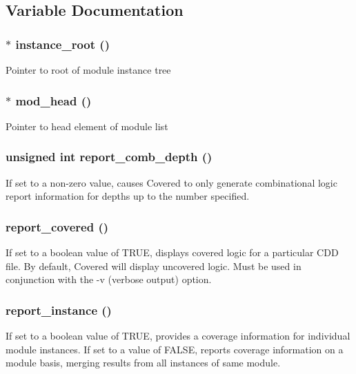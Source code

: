 \subsection{Variable Documentation}
\subsubsection{$\ast$ instance\_\-root ()}\label{comb_8c_a0}


Pointer to root of module instance tree 
\subsubsection{$\ast$ mod\_\-head ()}\label{comb_8c_a1}


Pointer to head element of module list 
\subsubsection{\setlength{\rightskip}{0pt plus 5cm}unsigned int report\_\-comb\_\-depth ()}\label{comb_8c_a3}


If set to a non-zero value, causes Covered to only generate combinational logic report information for depths up to the number specified. 
\subsubsection{ report\_\-covered ()}\label{comb_8c_a2}


If set to a boolean value of TRUE, displays covered logic for a particular CDD file. By default, Covered will display uncovered logic. Must be used in conjunction with the -v (verbose output) option. 
\subsubsection{ report\_\-instance ()}\label{comb_8c_a4}


If set to a boolean value of TRUE, provides a coverage information for individual module instances. If set to a value of FALSE, reports coverage information on a module basis, merging results from all instances of same module. 